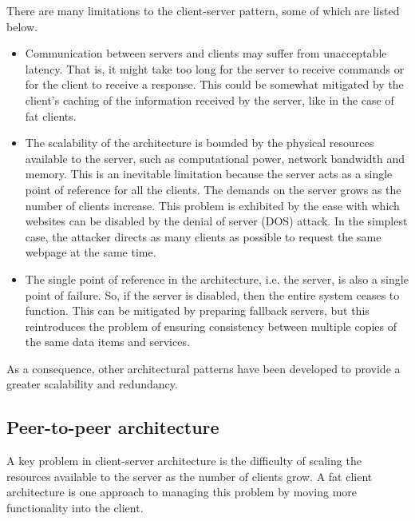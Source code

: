 \documentclass[a4paper, openany]{memoir}
\begin{document}
There are many limitations to the client-server pattern, some of which are listed below.
\begin{itemize}
    \item Communication between servers and clients may suffer from unacceptable latency. That is, it might take too long for the server to receive commands or for the client to receive a response. This could be somewhat mitigated by the client's caching of the information received by the server, like in the case of fat clients.
    \item The scalability of the architecture is bounded by the physical resources available to the server, such as computational power, network bandwidth and memory. This is an inevitable limitation because the server acts as a single point of reference for all the clients. The demands on the server grows as the number of clients increase. This problem is exhibited by the ease with which websites can be disabled by the denial of server (DOS) attack. In the simplest case, the attacker directs as many clients as possible to request the same webpage at the same time.
    \item The single point of reference in the architecture, i.e. the server, is also a single point of failure. So, if the server is disabled, then the entire system ceases to function. This can be mitigated by preparing fallback servers, but this reintroduces the problem of ensuring consistency between multiple copies of the same data items and services.
\end{itemize}

As a consequence, other architectural patterns have been developed to provide a greater scalability and redundancy.

\subsection{Peer-to-peer architecture}
A key problem in client-server architecture is the difficulty of scaling the resources available to the server as the number of clients grow. A fat client architecture is one approach to managing this problem by moving more functionality into the client.
\end{document}
